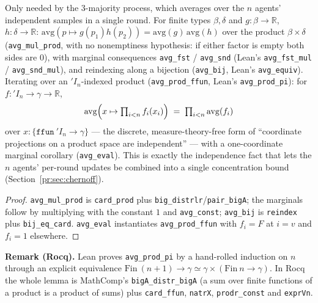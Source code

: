 \begin{lemma}\label{pr:indep}
  \rocqok
  Only needed by the 3-majority process, which averages over the $n$ agents'
  independent samples in a single round. For finite types $\beta,\delta$ and
  $g \colon \beta\to\mathbb{R}$, $h\colon\delta\to\mathbb{R}$:
  $\mathrm{avg}(p \mapsto g(p_1)h(p_2)) = \mathrm{avg}(g)\,\mathrm{avg}(h)$
  over the product $\beta\times\delta$ (\texttt{avg\_mul\_prod}, with no
  nonemptiness hypothesis: if either factor is empty both sides are $0$),
  with marginal consequences \texttt{avg\_fst} / \texttt{avg\_snd} (Lean's
  \texttt{avg\_fst\_mul} / \texttt{avg\_snd\_mul}), and reindexing along a
  bijection (\texttt{avg\_bij}, Lean's \texttt{avg\_equiv}). Iterating over an
  $'I_n$-indexed product (\texttt{avg\_prod\_ffun}, Lean's
  \texttt{avg\_prod\_pi}): for $f \colon 'I_n \to \gamma \to \mathbb{R}$,
  \[
    \mathrm{avg}\Bigl(x \mapsto \textstyle\prod_{i < n} f_i(x_i)\Bigr)
      \;=\; \prod_{i < n} \mathrm{avg}(f_i)
  \]
  over $x \colon \{\texttt{ffun}\ 'I_n \to \gamma\}$ --- the discrete,
  measure-theory-free form of ``coordinate projections on a product space
  are independent'' --- with a one-coordinate marginal corollary
  (\texttt{avg\_eval}). This is exactly the independence fact that lets the
  $n$ agents' per-round updates be combined into a single concentration
  bound (Section~\ref{pr:sec:chernoff}).
\end{lemma}
\begin{proof}
  \rocqok
  \texttt{avg\_mul\_prod} is \texttt{card\_prod} plus
  \texttt{big\_distrlr}/\texttt{pair\_bigA}; the marginals follow by
  multiplying with the constant $1$ and \texttt{avg\_const};
  \texttt{avg\_bij} is \texttt{reindex} plus \texttt{bij\_eq\_card}.
  \texttt{avg\_eval} instantiates \texttt{avg\_prod\_ffun} with
  $f_i = F$ at $i = v$ and $f_i = 1$ elsewhere.
\end{proof}

\noindent\textbf{Remark (Rocq).} Lean proves \texttt{avg\_prod\_pi} by a
hand-rolled induction on $n$ through an explicit equivalence
$\mathrm{Fin}\ (n{+}1) \to \gamma \simeq \gamma \times (\mathrm{Fin}\ n \to
\gamma)$. In Rocq the whole lemma is MathComp's \texttt{bigA\_distr\_bigA}
(a sum over finite functions of a product is a product of sums) plus
\texttt{card\_ffun}, \texttt{natrX}, \texttt{prodr\_const} and
\texttt{exprVn}.

